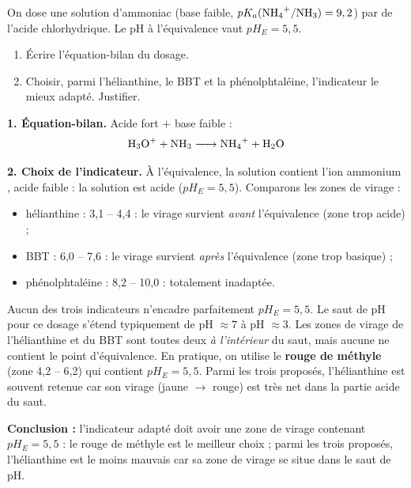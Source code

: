 \documentclass[11pt]{article}
\begin{document}
\begin{exoresolu}
On dose une solution d'ammoniac  (base faible, $pK_a(\ce{NH4+}/\ce{NH3}) = 9,2$) par de l'acide chlorhydrique. Le pH à l'équivalence vaut $pH_E = 5,5$.
\begin{enumerate}
\item Écrire l'équation-bilan du dosage.
\item Choisir, parmi l'hélianthine, le BBT et la phénolphtaléine, l'indicateur le mieux adapté. Justifier.
\end{enumerate}
\tcblower
\textbf{1. Équation-bilan.} Acide fort + base faible :
\[ \ce{H3O+ + NH3 -> NH4+ + H2O} \]

\textbf{2. Choix de l'indicateur.} À l'équivalence, la solution contient l'ion ammonium , acide faible : la solution est acide ($pH_E = 5,5$). Comparons les zones de virage :
\begin{itemize}
\item hélianthine : 3,1 -- 4,4 : le virage survient \emph{avant} l'équivalence (zone trop acide) ;
\item BBT : 6,0 -- 7,6 : le virage survient \emph{après} l'équivalence (zone trop basique) ;
\item phénolphtaléine : 8,2 -- 10,0 : totalement inadaptée.
\end{itemize}
Aucun des trois indicateurs n'encadre parfaitement $pH_E = 5,5$. Le saut de pH pour ce dosage s'étend typiquement de pH $\approx 7$ à pH $\approx 3$. Les zones de virage de l'hélianthine et du BBT sont toutes deux \emph{à l'intérieur} du saut, mais aucune ne contient le point d'équivalence. En pratique, on utilise le \textbf{rouge de méthyle} (zone 4,2 -- 6,2) qui contient $pH_E = 5,5$. Parmi les trois proposés, l'hélianthine est souvent retenue car son virage (jaune $\to$ rouge) est très net dans la partie acide du saut.

\textbf{Conclusion :} l'indicateur adapté doit avoir une zone de virage contenant $pH_E = 5,5$ : le rouge de méthyle est le meilleur choix ; parmi les trois proposés, l'hélianthine est le moins mauvais car sa zone de virage se situe dans le saut de pH.
\end{exoresolu}
\end{document}
